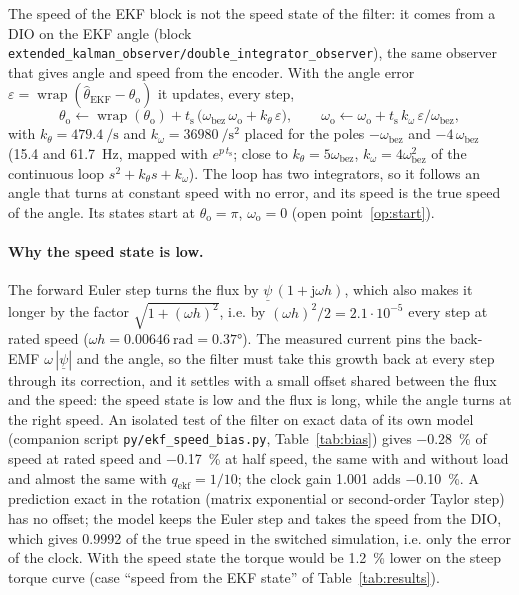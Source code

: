 \documentclass[11pt,a4paper]{scrartcl}
\newcommand{\ped}[1]{_{\mathrm{#1}}}
\newcommand{\code}[1]{\texttt{#1}}
\newcommand{\jj}{\mathrm{j}}
\begin{document}
\begin{onehalfspace}
The speed of the EKF block is not the speed state of the filter: it comes from a DIO on the EKF angle (block \code{extended\_kalman\_observer/double\_integrator\_observer}), the same observer that gives angle and speed from the encoder. With the angle error $\varepsilon = \operatorname{wrap}(\hat\theta\ped{EKF} - \theta\ped{o})$ it updates, every step,
\begin{equation}
	\theta\ped{o} \leftarrow \operatorname{wrap}(\theta\ped{o}) + t\ped{s}\,\big(\omega\ped{bez}\,\omega\ped{o} + k_\theta\,\varepsilon\big), \qquad
	\omega\ped{o} \leftarrow \omega\ped{o} + t\ped{s}\,k_\omega\,\varepsilon/\omega\ped{bez},
	\label{eq:dio}
\end{equation}
with $k_\theta = \SI{479.4}{\per\second}$ and $k_\omega = \SI{36980}{\per\second\squared}$ placed for the poles $-\omega\ped{bez}$ and $-4\,\omega\ped{bez}$ (\SI{15.4}{} and \SI{61.7}{\hertz}, mapped with $e^{p\,t\ped{s}}$; close to $k_\theta = 5\omega\ped{bez}$, $k_\omega = 4\omega\ped{bez}^2$ of the continuous loop $s^2 + k_\theta s + k_\omega$). The loop has two integrators, so it follows an angle that turns at constant speed with no error, and its speed is the true speed of the angle. Its states start at $\theta\ped{o} = \pi$, $\omega\ped{o} = 0$ (open point~\ref{op:start}).

\paragraph{Why the speed state is low.} The forward Euler step turns the flux by $\underline{\psi}\,(1 + \jj\omega h)$, which also makes it longer by the factor $\sqrt{1 + (\omega h)^2}$, i.e. by $(\omega h)^2/2 = 2.1\cdot10^{-5}$ every step at rated speed ($\omega h = \SI{0.00646}{\radian} = \ang{0.37}$). The measured current pins the back-EMF $\omega\,|\underline{\psi}|$ and the angle, so the filter must take this growth back at every step through its correction, and it settles with a small offset shared between the flux and the speed: the speed state is low and the flux is long, while the angle turns at the right speed. An isolated test of the filter on exact data of its own model (companion script \code{py/ekf\_speed\_bias.py}, Table~\ref{tab:bias}) gives \SI{-0.28}{\percent} of speed at rated speed and \SI{-0.17}{\percent} at half speed, the same with and without load and almost the same with $q\ped{ekf} = 1/10$; the clock gain 1.001 adds \SI{-0.10}{\percent}. A prediction exact in the rotation (matrix exponential or second-order Taylor step) has no offset; the model keeps the Euler step and takes the speed from the DIO, which gives 0.9992 of the true speed in the switched simulation, i.e. only the error of the clock. With the speed state the torque would be \SI{1.2}{\percent} lower on the steep torque curve (case ``speed from the EKF state'' of Table~\ref{tab:results}).


\end{onehalfspace}
\end{document}
